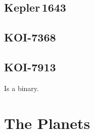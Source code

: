 \documentclass[12pt,twocolumn,linenumbers]{aastex63}
\begin{document}
\subsection{Kepler\,1643}
\subsection{KOI-7368}
\subsection{KOI-7913}
Is a binary.

\section{The Planets}
\label{sec:planet}
\end{document}
